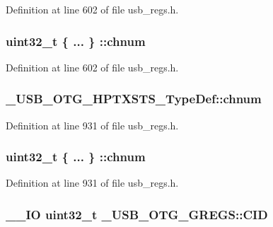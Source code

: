Definition at line 602 of file usb\-\_\-regs.\-h.

\hypertarget{group___u_s_b___o_t_g___d_r_i_v_e_r_gabf8d2dafc1b44489f8294be519c65718}{
\subsubsection[{chnum}]{\setlength{\rightskip}{0pt plus 5cm}uint32\-\_\-t \{ ... \} \-::chnum}}\label{group___u_s_b___o_t_g___d_r_i_v_e_r_gabf8d2dafc1b44489f8294be519c65718}


Definition at line 602 of file usb\-\_\-regs.\-h.

\hypertarget{group___u_s_b___o_t_g___d_r_i_v_e_r_ga90c08b176500a5c5a70082a3aae318b2}{
\subsubsection[{chnum}]{ \-\_\-\-U\-S\-B\-\_\-\-O\-T\-G\-\_\-\-H\-P\-T\-X\-S\-T\-S\-\_\-\-Type\-Def\-::chnum}}\label{group___u_s_b___o_t_g___d_r_i_v_e_r_ga90c08b176500a5c5a70082a3aae318b2}


Definition at line 931 of file usb\-\_\-regs.\-h.

\hypertarget{group___u_s_b___o_t_g___d_r_i_v_e_r_ga7e07ecff7a7ae6f1f5ecc37ae53c858c}{
\subsubsection[{chnum}]{\setlength{\rightskip}{0pt plus 5cm}uint32\-\_\-t \{ ... \} \-::chnum}}\label{group___u_s_b___o_t_g___d_r_i_v_e_r_ga7e07ecff7a7ae6f1f5ecc37ae53c858c}


Definition at line 931 of file usb\-\_\-regs.\-h.

\hypertarget{group___u_s_b___o_t_g___d_r_i_v_e_r_ga19d68aae52d7d55565b2acb97f74d366}{
\subsubsection[{C\-I\-D}]{\setlength{\rightskip}{0pt plus 5cm}\-\_\-\-\_\-\-I\-O {\bf uint32\-\_\-t} \-\_\-\-U\-S\-B\-\_\-\-O\-T\-G\-\_\-\-G\-R\-E\-G\-S\-::\-C\-I\-D}}\label{group___u_s_b___o_t_g___d_r_i_v_e_r_ga19d68aae52d7d55565b2acb97f74d366}



